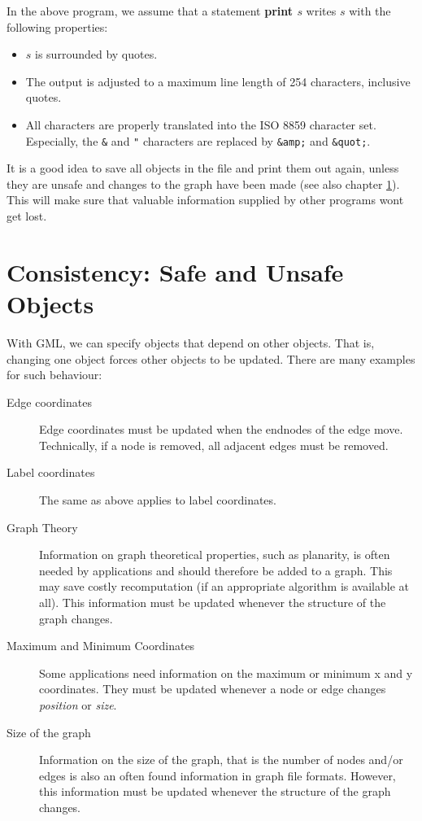 \noindent In the above program, we assume that a statement \textbf{print
  $s$} writes $s$ with the following properties:

\begin{itemize}
  \item $s$ is surrounded by quotes.
  \item The output is adjusted to a maximum line length of 254 characters, 
  inclusive quotes.
  \item All characters are properly translated into the ISO 8859
  character set. Especially, the \verb|&| and \verb|"| characters
  are replaced by \verb|&amp;| and \verb|&quot;|.
\end{itemize}
  
It is a good idea to save all objects in the file and print them
out again, unless they are unsafe and changes to the graph have
been made (see also chapter \ref{c:GML:Consistency}).  This will
make sure that valuable information supplied by other programs
wont get lost.
  

%
%
  

\chapter{Consistency: Safe and Unsafe Objects}
\label{c:GML:Consistency}

With GML, we can specify objects that depend on other objects.
That is, changing one object forces other objects to be updated.
There are many examples for such behaviour:

\begin{description}
  \item[Edge coordinates] Edge coordinates must be updated when
  the endnodes of the edge move.  Technically, if a node is
  removed, all adjacent edges must be removed.
  
  \item[Label coordinates] The same as above applies to label
  coordinates.
 
  \item[Graph Theory] Information on graph theoretical
  properties, such as planarity, is often needed by applications
  and should therefore be added to a graph. This may save costly
  recomputation (if an appropriate algorithm is available at
  all). This information must be updated whenever the structure
  of the graph changes.
  
  \item[Maximum and Minimum Coordinates] Some applications need
  information on the maximum or minimum x and y coordinates.
  They must be updated whenever a node or edge changes
  \emph{position} or \emph{size}.
  
  \item[Size of the graph] Information on the size of the graph,
  that is the number of nodes and/or edges is also an often
  found information in graph file formats.  However, this
  information must be updated whenever the structure of the graph
  changes.
\end{description}

